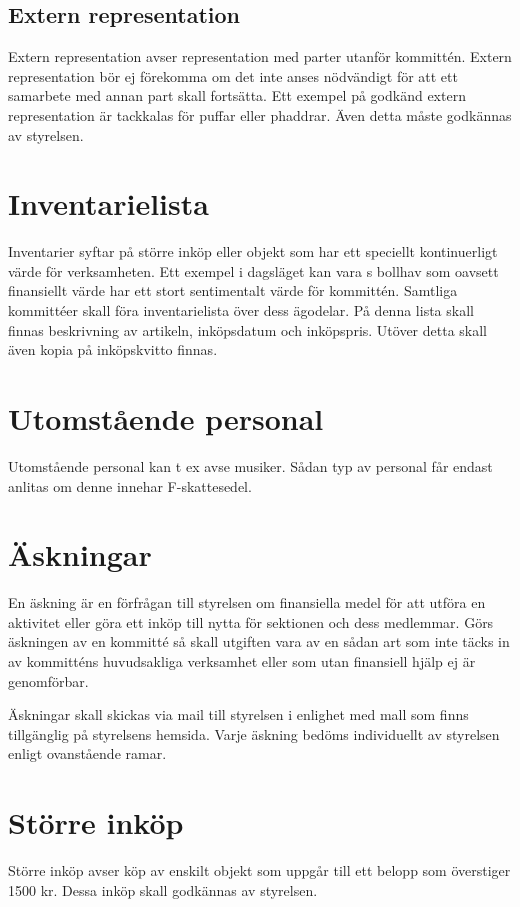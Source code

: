 \documentclass[11pt, includeaddress]{../../classes/cthit}
\begin{document}
\subsection{Extern representation}
Extern representation avser representation med parter utanför kommittén. Extern representation bör ej förekomma om det inte anses nödvändigt för att ett samarbete med annan part skall fortsätta. Ett exempel på godkänd extern representation är tackkalas för puffar eller phaddrar. Även detta måste godkännas av styrelsen.


\section{Inventarielista}
Inventarier syftar på större inköp eller objekt som har ett speciellt kontinuerligt värde för verksamheten. Ett exempel i dagsläget kan vara \NOLLKIT{}s bollhav som oavsett finansiellt värde har ett stort sentimentalt värde för kommittén. Samtliga kommittéer skall föra inventarielista över dess ägodelar. På denna lista skall finnas beskrivning av artikeln, inköpsdatum och inköpspris. Utöver detta skall även kopia på inköpskvitto finnas.


\section{Utomstående personal}
Utomstående personal kan t ex avse musiker. Sådan typ av personal får endast anlitas om denne innehar F-skattesedel. 


\section{Äskningar}
En äskning är en förfrågan till styrelsen om finansiella medel för att utföra en aktivitet eller göra ett inköp till nytta för sektionen och dess medlemmar. Görs äskningen av en kommitté så skall utgiften vara av en sådan art som inte täcks in av kommitténs huvudsakliga verksamhet eller som utan finansiell hjälp ej är genomförbar. 

Äskningar skall skickas via mail till styrelsen i enlighet med mall som finns tillgänglig på styrelsens hemsida. Varje äskning bedöms individuellt av styrelsen enligt ovanstående ramar. 


\section{Större inköp}
Större inköp avser köp av enskilt objekt som uppgår till ett belopp som överstiger 1500 kr. Dessa inköp skall godkännas av styrelsen.
\end{document}
